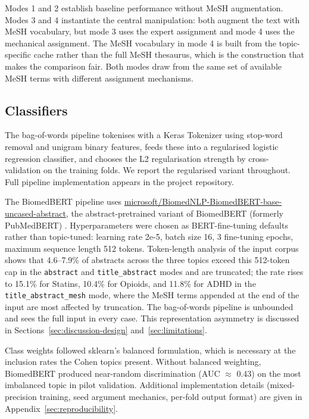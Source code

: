 \documentclass{article}
\begin{document}
Modes 1 and 2 establish baseline performance without MeSH augmentation. Modes 3 and 4 instantiate the central manipulation: both augment the text with MeSH vocabulary, but mode 3 uses the expert assignment and mode 4 uses the mechanical assignment. The MeSH vocabulary in mode 4 is built from the topic-specific cache rather than the full MeSH thesaurus, which is the construction that makes the comparison fair. Both modes draw from the same set of available MeSH terms with different assignment mechanisms.

\subsection{Classifiers}\label{sec:classifiers}

The bag-of-words pipeline tokenises with a Keras Tokenizer using stop-word removal and unigram binary features, feeds these into a regularised logistic regression classifier, and chooses the L2 regularisation strength by cross-validation on the training folds. We report the regularised variant throughout. Full pipeline implementation appears in the project repository.

The BiomedBERT pipeline uses \url{microsoft/BiomedNLP-BiomedBERT-base-uncased-abstract}, the abstract-pretrained variant of BiomedBERT (formerly PubMedBERT) \cite{gu2021biomedbert}. Hyperparameters were chosen as BERT-fine-tuning defaults rather than topic-tuned: learning rate 2e-5, batch size 16, 3 fine-tuning epochs, maximum sequence length 512 tokens. Token-length analysis of the input corpus shows that 4.6--7.9\% of abstracts across the three topics exceed this 512-token cap in the \texttt{abstract} and \texttt{title\_abstract} modes and are truncated; the rate rises to 15.1\% for Statins, 10.4\% for Opioids, and 11.8\% for ADHD in the \texttt{title\_abstract\_mesh} mode, where the MeSH terms appended at the end of the input are most affected by truncation. The bag-of-words pipeline is unbounded and sees the full input in every case. This representation asymmetry is discussed in Sections~\ref{sec:discussion-design} and~\ref{sec:limitations}.

Class weights followed sklearn's balanced formulation, which is necessary at the inclusion rates the Cohen topics present. Without balanced weighting, BiomedBERT produced near-random discrimination (AUC $\approx$ 0.43) on the most imbalanced topic in pilot validation. Additional implementation details (mixed-precision training, seed argument mechanics, per-fold output format) are given in Appendix~\ref{sec:reproducibility}.
\end{document}
